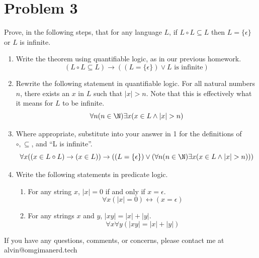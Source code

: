 \documentclass[letterpaper, 12pt]{math}
\begin{document}
\section*{Problem 3}
Prove, in the following steps, that for any language \( L \), if
\( L\circ L\subseteq L \) then \( L = \{\epsilon\} \) or \( L \) is
infinite.
\begin{enumerate}
  \item Write the theorem using quantifiable logic, as in our previous
    homework.
    \[ (L\circ L\subseteq L)\to((L =
      \{\epsilon\}) \vee L \text{ is infinite}) \]
  \item Rewrite the following statement in quantifiable logic. For all natural
    numbers \( n \), there exists an \( x \) in \( L \) such that \( |x|>n \).
    Note that this is effectively what it means for \( L \) to be infinite.
    \[ \forall{n}(n\in\N)\exists{x}(x\in L\wedge |x|>n) \]
  \item Where appropriate, substitute into your answer in 1 for the definitions
    of \( \circ,\subseteq \), and ``L is infinite''.
    \[ \forall{x}((x\in L\circ L)\to(x\in L))\to((L =
      \{\epsilon\})\vee(\forall{n}(n\in\N)\exists{x}(x\in L\wedge |x|>n))) \]
  \item Write the following statements in predicate logic.
    \begin{enumerate}
      \item For any string \( x \), \( |x| = 0 \) if and only if
        \( x = \epsilon \).
        \[ \forall{x}(|x| = 0)\leftrightarrow(x = \epsilon) \]
      \item For any strings \( x \) and \( y \), \( |xy| = |x|+|y| \).
        \[ \forall{x}\forall{y}(|xy| = |x|+|y|) \]
    \end{enumerate}
\end{enumerate}

\begin{center}
  If you have any questions, comments, or concerns, please contact me at
  alvin@omgimanerd.tech
\end{center}
\end{document}
